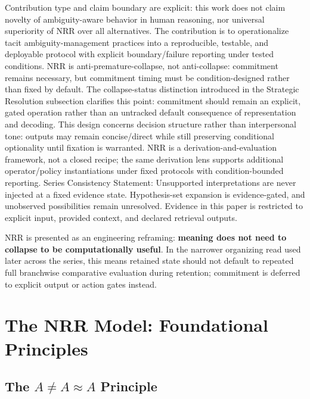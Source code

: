 \documentclass[11pt,a4paper]{article}
\newcommand{\AneqAapproxA}{A \neq A \approx A}
\begin{document}
Contribution type and claim boundary are explicit: this work does not claim novelty of ambiguity-aware behavior in human reasoning, nor universal superiority of NRR over all alternatives. The contribution is to operationalize tacit ambiguity-management practices into a reproducible, testable, and deployable protocol with explicit boundary/failure reporting under tested conditions.
NRR is anti-premature-collapse, not anti-collapse: commitment remains necessary, but commitment timing must be condition-designed rather than fixed by default.
The collapse-status distinction introduced in the Strategic Resolution subsection clarifies this point: commitment should remain an explicit, gated operation rather than an untracked default consequence of representation and decoding.
This design concerns decision structure rather than interpersonal tone: outputs may remain concise/direct while still preserving conditional optionality until fixation is warranted.
NRR is a derivation-and-evaluation framework, not a closed recipe; the same derivation lens supports additional operator/policy instantiations under fixed protocols with condition-bounded reporting.
Series Consistency Statement: Unsupported interpretations are never injected at a fixed evidence state. Hypothesis-set expansion is evidence-gated, and unobserved possibilities remain unresolved. Evidence in this paper is restricted to explicit input, provided context, and declared retrieval outputs.

NRR is presented as an engineering reframing: \textbf{meaning does not need to collapse to be computationally useful}. In the narrower organizing read used later across the series, this means retained state should not default to repeated full branchwise comparative evaluation during retention; commitment is deferred to explicit output or action gates instead.

\section{The NRR Model: Foundational Principles}

\subsection{The $\AneqAapproxA$ Principle}
\end{document}
